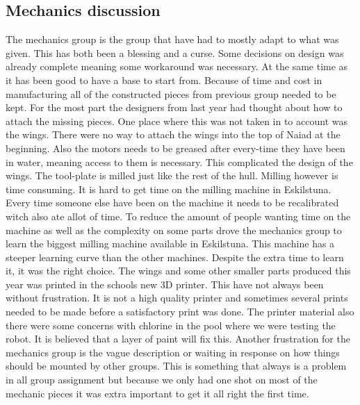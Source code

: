 \subsection{Mechanics discussion}
The mechanics group is the group that have had to mostly adapt to what was given. This has both been a blessing and a curse. Some decisions on design was already complete meaning some workaround was necessary. At the same time as it has been good to have a base to start from. Because of time and cost in manufacturing all of the constructed pieces from previous group needed to be kept. For the most part the designers from last year had thought about how to attach the missing pieces. One place where this was not taken in to account was the wings. There were no way to attach the wings into the top of Naiad at the beginning. Also the motors needs to be greased after every-time they have been in water, meaning access to them is necessary. This complicated the design of the wings.
The tool-plate is milled just like the rest of the hull. Milling however is time consuming. It is hard to get time on the milling machine in Eskilstuna. Every time someone else have been on the machine it needs to be recalibrated witch also ate allot of time. To reduce the amount of people wanting time on the machine as well as the complexity on some parts drove the mechanics group to learn the biggest milling machine available in Eskilstuna. This machine has a steeper learning curve than the other machines. Despite the extra time to learn it, it was the right choice. 
The wings and some other smaller parts produced this year was printed in the schools new 3D printer. This have not always been without frustration. It is not a high quality printer and sometimes several prints needed to be made before a satisfactory print was done. The printer material also there were some concerns with chlorine in the pool where we were testing the robot. It is believed that a layer of paint will fix this. 
Another frustration for the mechanics group is the vague description or waiting in response on how things should be mounted by other groups. This is something that always is a problem in all group assignment but because we only had one shot on most of the mechanic pieces it was extra important to get it all right the first time. 


